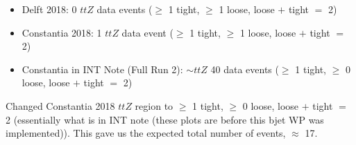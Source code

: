 \documentclass[]{article}
\begin{document}
\begin{itemize}
	\item Delft 2018: 0 $ttZ$ data events ($\geq$ 1 tight, $\geq$ 1 loose, loose $+$ tight $=$ 2)
	\item Constantia 2018: 1 $ttZ$ data event ($\geq$ 1 tight, $\geq$ 1 loose, loose $+$ tight $=$ 2)
	\item Constantia in INT Note (Full Run 2): $\sim ttZ$ 40 data events ($\geq$ 1 tight, $\geq$ 0 loose, loose $+$ tight $=$ 2)
\end{itemize}

Changed Constantia 2018 $ttZ$ region to $\geq$ 1 tight, $\geq$ 0 loose, loose $+$ tight $=$ 2 (essentially what is in INT note (these plots are before this bjet WP was implemented)). This gave us the expected total number of events, $\approx$ 17.
\end{document}
